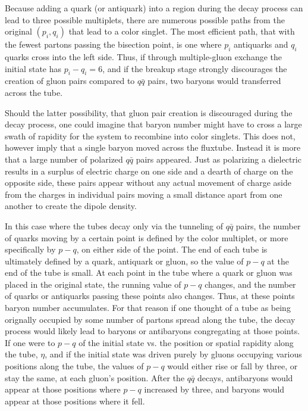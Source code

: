\documentclass[aps, prc, 12pt, nofootinbib, showpacs, superscriptaddress, tightenlines, groupedaddress]{revtex4-2}
\begin{document}
Because adding a quark (or antiquark) into a region during the decay process can lead to three possible multiplets, there are numerous possible paths from the original $(p_i,q_i)$ that lead to a color singlet. The most efficient path, that with the fewest partons passing the bisection point, is one where $p_i$ antiquarks and $q_i$ quarks cross into the left side. Thus, if through multiple-gluon exchange the initial state has $p_i-q_i=6$, and if the breakup stage strongly discourages the creation of gluon pairs compared to $q\bar{q}$ pairs, two baryons would transferred across the tube. 

Should the latter possibility, that gluon pair creation is discouraged during the decay process, one could imagine that baryon number might have to cross a large swath of rapidity for the system to recombine into color singlets. This does not, however imply that a single baryon moved across the fluxtube. Instead it is more that a large number of polarized $q\bar{q}$ pairs appeared. Just as polarizing a dielectric results in a surplus of electric charge on one side and a dearth of charge on the opposite side, these pairs appear without any actual movement of charge aside from the charges in individual pairs moving a small distance apart from one another to create the dipole density.

In this case where the tubes decay only via the tunneling of $q\bar{q}$ pairs, the number of quarks moving by a certain point is defined by the color multiplet, or more specifically by $p-q$, on either side of the point. The end of each tube is ultimately defined by a quark, antiquark or gluon, so the value of $p-q$ at the end of the tube is small. At each point in the tube where a quark or gluon was placed in the original state, the running value of $p-q$ changes, and the number of quarks or antiquarks passing these points also changes. Thus, at these points baryon number accumulates. For that reason if one thought of a tube as being orignally occupied by some number of partons spread along the tube, the decay process would likely lead to baryons or antibaryons congregating at those points. If one were to $p-q$ of the initial state vs. the position or spatial rapidity along the tube, $\eta$, and if the initial state was driven purely by gluons occupying various positions along the tube, the values of $p-q$ would either rise or fall by three, or stay the same, at each gluon's position. After the $q\bar{q}$ decays, antibaryons would appear at those positions where $p-q$ increased by three, and baryons would appear at those positions where it fell. 
\end{document}
